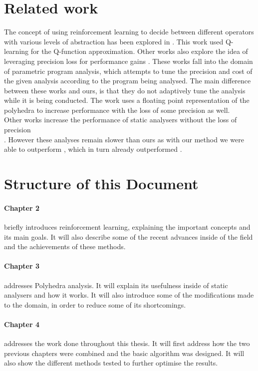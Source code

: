 \section{Related work}
The concept of using reinforcement learning to decide between different operators with various levels of abstraction has been explored in \cite{singh2018fast}. This work used Q-learning for the Q-function approximation. Other works also explore the idea of leveraging precision loss for performance gains \cite{oh2015learning,oh2014selective,liang2011learning}. These works fall into the domain of parametric program analysis, which attempts to tune the precision and cost of the given analysis according to the program being analysed. The main difference between these works and ours, is that they do not adaptively tune the analysis while it is being conducted. The work \cite{chen2008sound} uses a floating point representation of the polyhedra to increase performance with the loss of some precision as well.\\
Other works increase the performance of static analysers without the loss of precision \\ \cite{singh2015making,singh2017fast}. However these analyses remain slower than ours as with our method we were able to outperform \cite{singh2018fast}, which in turn already outperformed \cite{singh2015making,singh2017fast}.


\section{Structure of this Document}

\paragraph{Chapter 2}briefly introduces reinforcement learning, explaining the important concepts and its main goals. It will also describe some of the recent advances inside of the field and the achievements of these methods.

\paragraph{Chapter 3}addresses Polyhedra analysis. It will explain its usefulness inside of static analysers and how it works. It will also introduce some of the modifications made to the domain, in order to reduce some of its shortcomings.

\paragraph{Chapter 4}addresses the work done throughout this thesis. It will first address how the two previous chapters were combined and the basic algorithm was designed. It will also show the different methods tested to further optimise the results.

